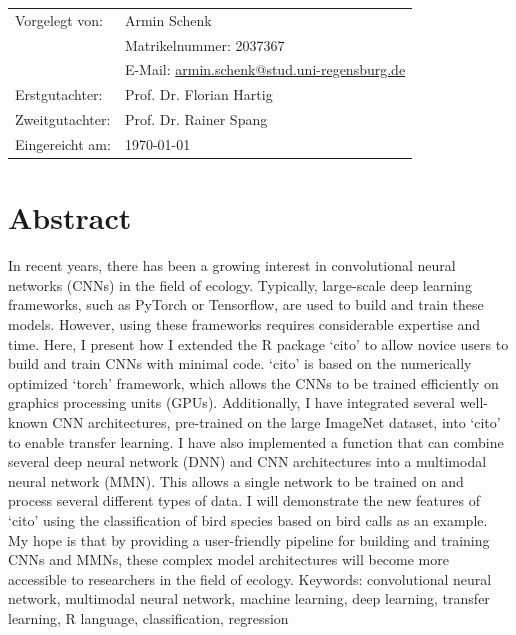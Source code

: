 \documentclass[12pt,twoside]{scrreport}
\newcommand{\pkg}[1]{`#1'}
\begin{document}
\begin{titlepage}
\begin{tabular}{ll}
Vorgelegt von: & Armin Schenk \\
& Matrikelnummer: 2037367 \\
& E-Mail: \url{armin.schenk@stud.uni-regensburg.de} \vspace{5mm}\\

Erstgutachter: & Prof. Dr. Florian Hartig\\
Zweitgutachter: & Prof. Dr. Rainer Spang \vspace{5mm}\\

Eingereicht am: & \today\\
\end{tabular}
\restoregeometry 
\end{titlepage}

\thispagestyle{empty}
\vspace*{\fill} %
\mbox{} %

\chapter*{Abstract}
\noindent In recent years, there has been a growing interest in convolutional neural networks (CNNs) in the field of ecology. Typically, large-scale deep learning frameworks, such as PyTorch or Tensorflow, are used to build and train these models. However, using these frameworks requires considerable expertise and time. Here, I present how I extended the R package \pkg{cito} to allow novice users to build and train CNNs with minimal code. \pkg{cito} is based on the numerically optimized \pkg{torch} framework, which allows the CNNs to be trained efficiently on graphics processing units (GPUs). Additionally, I have integrated several well-known CNN architectures, pre-trained on the large ImageNet dataset, into \pkg{cito} to enable transfer learning. I have also implemented a function that can combine several deep neural network (DNN) and CNN architectures into a multimodal neural network (MMN). This allows a single network to be trained on and process several different types of data. I will demonstrate the new features of \pkg{cito} using the classification of bird species based on bird calls as an example. My hope is that by providing a user-friendly pipeline for building and training CNNs and MMNs, these complex model architectures will become more accessible to researchers in the field of ecology.
\newline\newline
Keywords: convolutional neural network, multimodal neural network, machine learning, deep learning, transfer learning, R language, classification, regression
\vspace{3cm}
\end{document}
